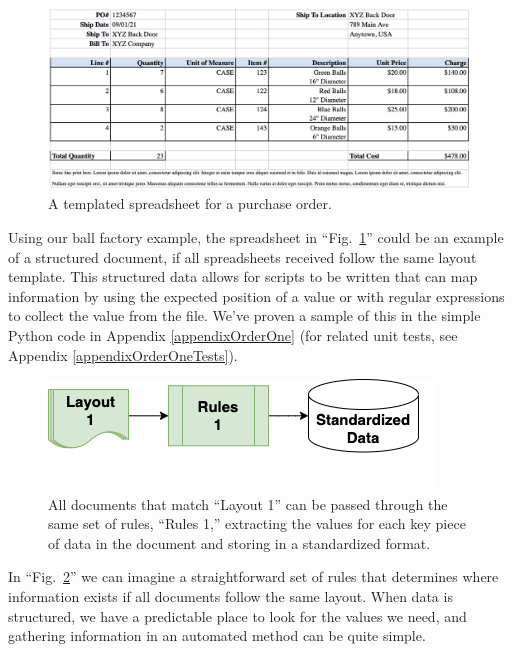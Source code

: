 \documentclass[conference]{IEEEtran}
\begin{document}
\begin{figure}[ht]
\centerline{\includegraphics[width=\columnwidth]{Spreadsheet1.png}}
\caption{A templated spreadsheet for a purchase order.}
\label{figSpreadsheet1}
\end{figure}

Using our ball factory example, the spreadsheet in ``Fig.~\ref{figSpreadsheet1}'' could be an example of a structured document, if all spreadsheets received follow the same layout template. This structured data allows for scripts to be written that can map information by using the expected position of a value or with regular expressions to collect the value from the file. We've proven a sample of this in the simple Python code in Appendix \ref{appendixOrderOne} (for related unit tests, see Appendix \ref{appendixOrderOneTests}).

\begin{figure}[ht]
\centerline{\includegraphics[width=\columnwidth]{RulesFlow1.png}}
\caption{All documents that match ``Layout 1'' can be passed through the same set of rules, ``Rules 1,'' extracting the values for each key piece of data in the document and storing in a standardized format.}
\label{figRulesFlow1}
\end{figure}

In ``Fig.~\ref{figRulesFlow1}'' we can imagine a straightforward set of rules that determines where information exists if all documents follow the same layout. When data is structured, we have a predictable place to look for the values we need, and gathering information in an automated method can be quite simple.
\end{document}

